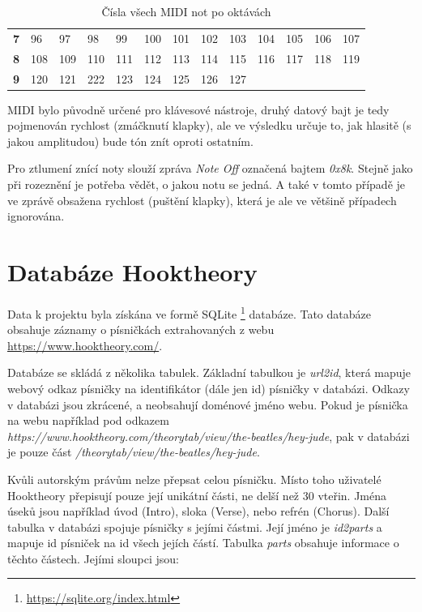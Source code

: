 \begin{table}[]
\begin{tabular}{l|llllllllllll}
        \textbf{7}                       & 96         & 97           & 98         & 99           & 100        & 101        & 102          & 103        & 104          & 105        & 106          & 107        \\
        \textbf{8}                       & 108        & 109          & 110        & 111          & 112        & 113        & 114          & 115        & 116          & 117        & 118          & 119        \\
        \textbf{9}                       & 120        & 121          & 222        & 123          & 124        & 125        & 126          & 127        & \multicolumn{4}{l}{}                                 
    \end{tabular}
    \caption{Čísla všech MIDI not po oktávách \cite{Back_SMF_Specif}}
    \label{tableMIDINotes}
\end{table}

MIDI bylo původně určené pro klávesové nástroje, 
druhý datový bajt je tedy pojmenován rychlost (zmáčknutí klapky),
ale ve výsledku určuje to, jak hlasitě (s jakou amplitudou) bude tón znít oproti ostatním.

Pro ztlumení znící noty slouží zpráva \emph{Note Off} označená bajtem \emph{0x8k}.
Stejně jako při rozeznění je potřeba vědět, o jakou notu se jedná.
A také v tomto případě je ve zprávě obsažena rychlost (puštění klapky), 
která je ale ve většině případech ignorována.
\cite{MIDI_tutorials}

\section{Databáze Hooktheory}
Data k projektu byla získána ve formě SQLite
\footnote{\url{https://sqlite.org/index.html}} databáze.
Tato databáze obsahuje záznamy o písničkách extrahovaných z webu \url{https://www.hooktheory.com/}.

Databáze se skládá z několika tabulek.
Základní tabulkou je \emph{url2id}, 
která mapuje webový odkaz písničky na identifikátor (dále jen id) písničky v databázi.
Odkazy v databázi jsou zkrácené, a neobsahují doménové jméno webu.
Pokud je písnička na webu 
například pod odkazem \emph{https://www.hooktheory.com/theorytab/view/the-beatles/hey-jude},
pak v databázi je pouze část \emph{/theorytab/view/the-beatles/hey-jude}.
\par

Kvůli autorským právům nelze přepsat celou písničku.
Místo toho uživatelé Hooktheory přepisují pouze její unikátní části, 
ne delší než 30 vteřin.
Jména úseků jsou například úvod (Intro), sloka (Verse), nebo refrén (Chorus).
\cite{ht_guide}
Další tabulka v databázi spojuje písničky s jejími částmi.
Její jméno je \emph{id2parts} a mapuje id písniček na id všech jejích částí.
Tabulka \emph{parts} obsahuje informace o těchto částech.
Jejími sloupci jsou:

